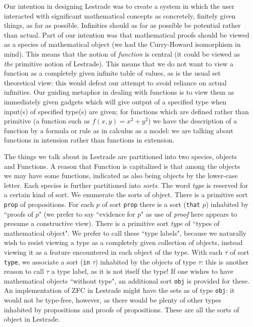 \documentclass{article}
\begin{document}
 Our intention in designing Lestrade was to create a system in which the user interacted with significant mathematical concepts as concretely, finitely given things, as far as possible.  Infinities should as far as possible be potential rather than actual.  Part of our intention was that mathematical proofs should be viewed as a species of mathematical object (we had the Curry-Howard isomorphism in mind).  This means that the notion of {\em function\/} is central (it could be viewed as {\em the\/} primitive notion of Lestrade).  This means that we do not want to view a function as a completely given infinite table of values, as is the usual set theoretical view:  this would defeat our attempt to avoid reliance on actual infinities.  Our guiding metaphor in dealing with functions is to view them as immediately given gadgets which will give output of a specified type when input(s) of specified type(s) are given;  for functions which are defined rather than primitive (a function such as $f(x,y)=x^2+y^2$) we have the description of a function by a formula or rule as in calculus as a model:  we are talking about functions in intension rather than functions in extension.

The things we talk about in Lestrade are partitioned into two species, objects and Functions.  A reason that Function is capitalized is that among the objects we may have some functions, indicated as also being objects by the lower-case letter.  Each species is further partitioned into {\em sorts\/}.  The word {\em type\/} is reserved for a certain kind of sort.  We enumerate the sorts of object.  There is a primitive sort {\tt prop} of propositions.  For each $p$ of sort
{\tt prop} there is a sort ({\tt that} $p$) inhabited by ``proofs of $p$" (we prefer to say ``evidence for $p$" as use of {\em proof\/} here appears to presume a constructive view).  There is a primitive sort {\em type\/} of ``types of mathematical object".  We prefer to call these ``type labels", because we naturally wish to resist viewing a type as a completely given collection of objects, instead viewing it as a feature encountered in each object of the type.  With each $\tau$ of sort {\tt type}, we associate a sort ({\tt in} $\tau$) inhabited by the objects of type $\tau$:  this is another reason to call $\tau$ a type label, as it is not itself the type!  If one wishes to have mathematical objects ``without type", an additional sort {\tt obj} is provided for these.  An implementation of ZFC in Lestrade might have the sets as of type {\tt obj}:  it would not be type-free, however, as there would be plenty of other types inhabited by propositions and proofs of propositions.  These are all the sorts of object in Lestrade.
\end{document}
